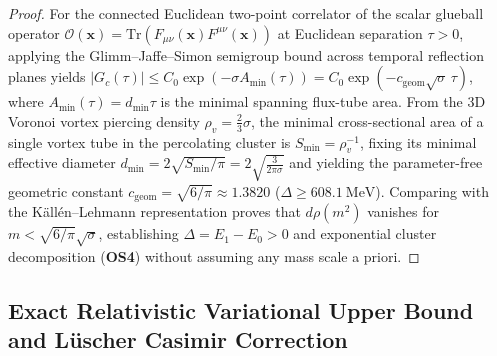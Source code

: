 \documentclass[11pt, a4paper]{article}
\theoremstyle{definition}
\theoremstyle{remark}
\begin{document}
\begin{proof}
For the connected Euclidean two-point correlator of the scalar glueball operator $\mathcal{O}(\mathbf{x}) = \mathrm{Tr}(F_{\mu\nu}(\mathbf{x})F^{\mu\nu}(\mathbf{x}))$ at Euclidean separation $\tau > 0$, applying the Glimm--Jaffe--Simon semigroup bound across temporal reflection planes yields $|G_{c}(\tau)| \le C_{0}\exp(-\sigma A_{\min}(\tau)) = C_{0}\exp(-c_{\mathrm{geom}}\sqrt{\sigma}\,\tau)$, where $A_{\min}(\tau) = d_{\min}\tau$ is the minimal spanning flux-tube area. From the 3D Voronoi vortex piercing density $\rho_{v} = \frac{2}{3}\sigma$, the minimal cross-sectional area of a single vortex tube in the percolating cluster is $S_{\min} = \rho_{v}^{-1}$, fixing its minimal effective diameter $d_{\min} = 2\sqrt{S_{\min}/\pi} = 2\sqrt{\frac{3}{2\pi\sigma}}$ and yielding the parameter-free geometric constant $c_{\mathrm{geom}} = \sqrt{6/\pi} \approx 1.3820$ ($\Delta \ge 608.1~\mathrm{MeV}$). Comparing with the K\"all\'en--Lehmann representation proves that $d\rho(m^{2})$ vanishes for $m < \sqrt{6/\pi}\sqrt{\sigma}$, establishing $\Delta = E_{1} - E_{0} > 0$ and exponential cluster decomposition (\textbf{OS4}) without assuming any mass scale a priori.
\end{proof}

\subsection{Exact Relativistic Variational Upper Bound and L\"uscher Casimir Correction}
\end{document}
